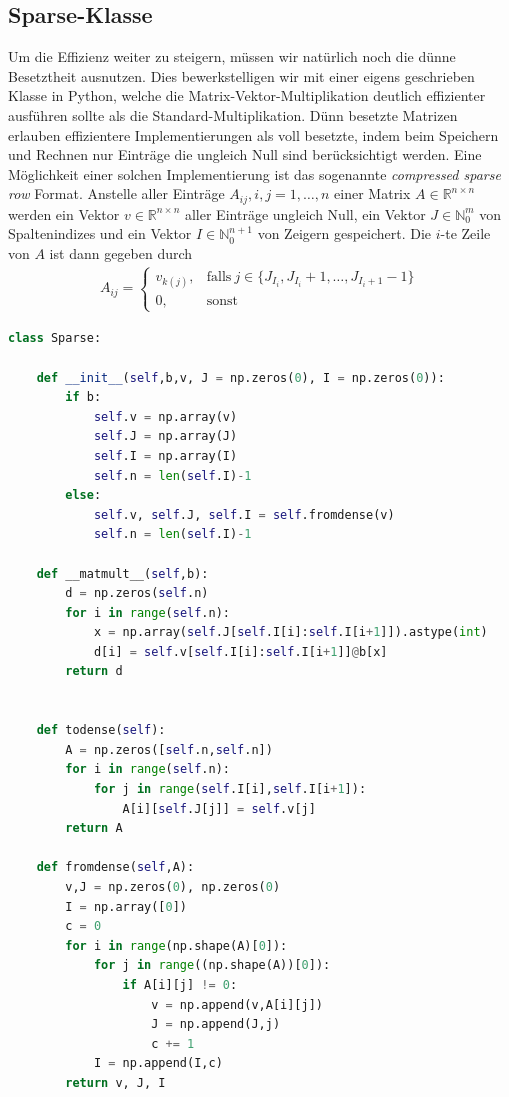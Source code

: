 \subsection{Sparse-Klasse}
Um die Effizienz weiter zu steigern, müssen wir natürlich noch die dünne Besetztheit ausnutzen.
Dies bewerkstelligen wir mit einer eigens geschrieben Klasse in Python, welche die Matrix-Vektor-Multiplikation
deutlich effizienter ausführen sollte als die Standard-Multiplikation.
Dünn besetzte Matrizen erlauben effizientere Implementierungen als voll besetzte, indem beim Speichern und Rechnen
nur Einträge die ungleich Null sind berücksichtigt werden. Eine Möglichkeit einer solchen Implementierung ist das sogenannte
\textit{compressed sparse row} Format. Anstelle aller Einträge $A_{ij}, i,j = 1,\dots,n$ einer Matrix $A \in \mathbb{R}^{n\times n}$
werden ein Vektor $v \in \mathbb{R}^{n\times n}$ aller Einträge ungleich Null, ein Vektor $J \in \mathbb{N}_0^m$ von Spaltenindizes
und ein Vektor $I \in \mathbb{N}_0^{n+1}$ von Zeigern gespeichert. Die $i$-te Zeile von $A$ ist dann gegeben durch
\begin{align*}
  A_{ij} = \begin{cases}
    v_{k(j)}, & \text{falls}~ j \in \{J_{I_i}, J_{I_i} + 1, \dots, J_{I_i + 1} - 1\} \\
    0, & \text{sonst}
  \end{cases}
\end{align*}
\begin{lstlisting}[language=Python]
class Sparse:

    def __init__(self,b,v, J = np.zeros(0), I = np.zeros(0)):
        if b:
            self.v = np.array(v)
            self.J = np.array(J)
            self.I = np.array(I)
            self.n = len(self.I)-1
        else:
            self.v, self.J, self.I = self.fromdense(v)
            self.n = len(self.I)-1

    def __matmult__(self,b):
        d = np.zeros(self.n)
        for i in range(self.n):
            x = np.array(self.J[self.I[i]:self.I[i+1]]).astype(int)
            d[i] = self.v[self.I[i]:self.I[i+1]]@b[x]
        return d


    def todense(self):
        A = np.zeros([self.n,self.n])
        for i in range(self.n):
            for j in range(self.I[i],self.I[i+1]):
                A[i][self.J[j]] = self.v[j]
        return A

    def fromdense(self,A):
        v,J = np.zeros(0), np.zeros(0)
        I = np.array([0])
        c = 0
        for i in range(np.shape(A)[0]):
            for j in range((np.shape(A))[0]):
                if A[i][j] != 0:
                    v = np.append(v,A[i][j])
                    J = np.append(J,j)
                    c += 1
            I = np.append(I,c)
        return v, J, I
\end{lstlisting}



